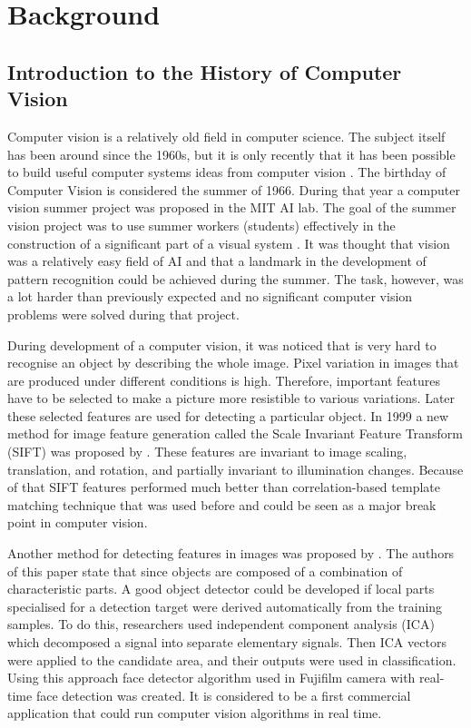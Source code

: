 \chapter{Background}

\section{Introduction to the History of Computer Vision}
\label{sec:intro}


Computer vision is a relatively old field in computer science. The subject itself has been around since the 1960s, but it is only recently that it has been possible to build useful computer systems ideas from computer vision \citep {cv}.
The birthday of Computer Vision is considered the summer of 1966.  During that year a computer vision summer project was proposed in the MIT AI lab. The goal of the summer vision project was to use summer workers (students) effectively in the construction of a significant part of a visual system  \citep{papert}. It was thought that vision was a relatively easy field of AI and that a landmark in the development of pattern recognition could be achieved during the summer. The task, however, was a lot harder than previously expected and no significant computer vision problems were solved during that project.

During development of a computer vision, it was noticed that is very hard to recognise an object by describing the whole image. Pixel variation in images that are produced under different conditions is high. Therefore, important features have to be selected to make a picture more resistible to various variations. Later these selected features are used for detecting a particular object. In 1999 a new method for image feature generation called the Scale Invariant Feature Transform (SIFT) was proposed by \cite{sift}. These features are invariant to image scaling, translation, and rotation, and partially invariant to illumination changes. Because of that SIFT features performed much better than correlation-based template matching technique that was used before and could be seen as a major break point in computer vision.
 
Another method for detecting features in images was proposed by \cite{nakano2006object}. The authors of this paper state that since objects are composed of a combination of characteristic parts. A good object detector could be developed if local parts specialised for a detection target were derived automatically from the training samples. To do this, researchers used independent component analysis (ICA) which decomposed a signal into separate elementary signals. Then ICA vectors were applied to the candidate area, and their outputs were used in classification. Using this approach face detector algorithm used in Fujifilm camera with real-time face detection was created. It is considered to be a first commercial application that could run computer vision algorithms in real time. 
 
